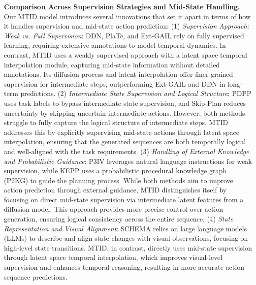 \textbf{Comparison Across Supervision Strategies and Mid-State Handling.} Our MTID model introduces several innovations that set it apart in terms of how it handles supervision and mid-state action prediction:
(1) \textit{Supervision Approach: Weak vs. Full Supervision}:
DDN, PlaTe, and Ext-GAIL rely on fully supervised learning, requiring extensive annotations to model temporal dynamics. In contrast, MTID uses a weakly supervised approach with a latent space temporal interpolation module, capturing mid-state information without detailed annotations. Its diffusion process and latent interpolation offer finer-grained supervision for intermediate steps, outperforming Ext-GAIL and DDN in long-term predictions.
(2) \textit{Intermediate State Supervision and Logical Structure}:
PDPP uses task labels to bypass intermediate state supervision, and Skip-Plan reduces uncertainty by skipping uncertain intermediate actions. However, both methods struggle to fully capture the logical structure of intermediate steps. MTID addresses this by explicitly supervising mid-state actions through latent space interpolation, ensuring that the generated sequences are both temporally logical and well-aligned with the task requirements.
(3) \textit{Handling of External Knowledge and Probabilistic Guidance}:
P3IV leverages natural language instructions for weak supervision, while KEPP uses a probabilistic procedural knowledge graph (P2KG) to guide the planning process. While both methods aim to improve action prediction through external guidance, MTID distinguishes itself by focusing on direct mid-state supervision via intermediate latent features from a diffusion model. This approach provides more precise control over action generation, ensuring logical consistency across the entire sequence.
(4) \textit{State Representation and Visual Alignment}:
SCHEMA relies on large language models (LLMs) to describe and align state changes with visual observations, focusing on high-level state transitions. MTID, in contrast, directly uses mid-state supervision through latent space temporal interpolation, which improves visual-level supervision and enhances temporal reasoning, resulting in more accurate action sequence predictions.


